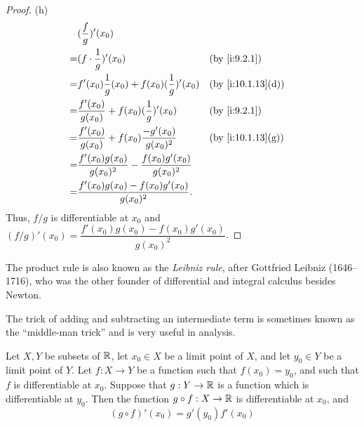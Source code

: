 \begin{proof}{(h)}
  \begin{align*}
      & (\dfrac{f}{g})'(x_0)                                                                       \\
    = & (f \cdot \dfrac{1}{g})'(x_0)                                        &  & \by{i:9.2.1}      \\
    = & f'(x_0) \dfrac{1}{g}(x_0) + f(x_0) (\dfrac{1}{g})'(x_0)             &  & \by{i:10.1.13}[d] \\
    = & \dfrac{f'(x_0)}{g(x_0)} + f(x_0) (\dfrac{1}{g})'(x_0)               &  & \by{i:9.2.1}      \\
    = & \dfrac{f'(x_0)}{g(x_0)} + f(x_0) \dfrac{-g'(x_0)}{g(x_0)^2}         &  & \by{i:10.1.13}[g] \\
    = & \dfrac{f'(x_0) g(x_0)}{g(x_0)^2} - \dfrac{f(x_0) g'(x_0)}{g(x_0)^2}                        \\
    = & \dfrac{f'(x_0) g(x_0) - f(x_0) g'(x_0)}{g(x_0)^2}.                                         \\
  \end{align*}
  Thus, \(f / g\) is differentiable at \(x_0\) and \((f / g)'(x_0) = \dfrac{f'(x_0) g(x_0) - f(x_0) g'(x_0)}{g(x_0)^2}\).
\end{proof}

\begin{rmk}\label{i:10.1.14}
  The product rule is also known as the \emph{Leibniz rule}, after Gottfried Leibniz (1646--1716), who was the other founder of differential and integral calculus besides Newton.
\end{rmk}

\begin{note}
  The trick of adding and subtracting an intermediate term is sometimes known as the ``middle-man trick'' and is very useful in analysis.
\end{note}

\begin{thm}\label{i:10.1.15}
  Let \(X, Y\) be subsets of \(\mathbb{R}\), let \(x_0 \in X\) be a limit point of \(X\), and let \(y_0 \in Y\) be a limit point of \(Y\).
  Let \(f : X \to Y\) be a function such that \(f(x_0) = y_0\), and such that \(f\) is differentiable at \(x_0\).
  Suppose that \(g : Y \to \mathbb{R}\) is a function which is differentiable at \(y_0\).
  Then the function \(g \circ f : X \to \mathbb{R}\) is differentiable at \(x_0\), and
  \[
    (g \circ f)'(x_0) = g'(y_0) f'(x_0)
  \]
\end{thm}


